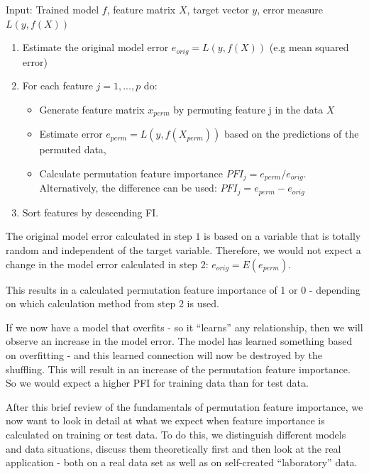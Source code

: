 \documentclass[]{krantz}
\providecommand{\tightlist}{%
  \setlength{\itemsep}{0pt}\setlength{\parskip}{0pt}}
\begin{document}
Input: Trained model \(f\), feature matrix \(X\), target vector \(y\),
error measure \(L(y,f(X))\)

\begin{enumerate}
\def\labelenumi{\arabic{enumi}.}
\tightlist
\item
  Estimate the original model error \(e_{orig} = L(y,f(X))\) (e.g mean
  squared error)
\item
  For each feature \(j = 1,...,p\) do:

  \begin{itemize}
  \tightlist
  \item
    Generate feature matrix \(x_{perm}\) by permuting feature j in the
    data \(X\)
  \item
    Estimate error \(e_{perm} = L(y,f(X_{perm}))\) based on the
    predictions of the permuted data,
  \item
    Calculate permutation feature importance
    \(PFI_{j} = e_{perm}/e_{orig}\). Alternatively, the difference can
    be used: \(PFI_{j} = e_{perm} - e_{orig}\)
  \end{itemize}
\item
  Sort features by descending FI.
\end{enumerate}

The original model error calculated in step \(1\) is based on a variable
that is totally random and independent of the target variable.
Therefore, we would not expect a change in the model error calculated in
step 2: \(e_{orig} = E(e_{perm})\).

This results in a calculated permutation feature importance of 1 or 0 -
depending on which calculation method from step 2 is used.

If we now have a model that overfits - so it ``learns'' any
relationship, then we will observe an increase in the model error. The
model has learned something based on overfitting - and this learned
connection will now be destroyed by the shuffling. This will result in
an increase of the permutation feature importance. So we would expect a
higher PFI for training data than for test data.

After this brief review of the fundamentals of permutation feature
importance, we now want to look in detail at what we expect when feature
importance is calculated on training or test data. To do this, we
distinguish different models and data situations, discuss them
theoretically first and then look at the real application - both on a
real data set as well as on self-created ``laboratory'' data.
\end{document}

